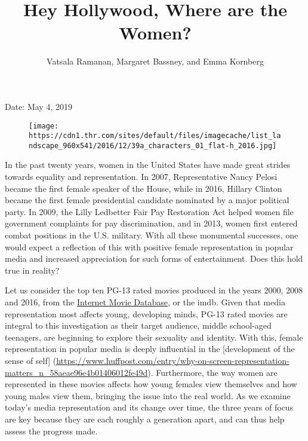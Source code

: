 \documentclass[ignorenonframetext,]{beamer}
\title{Hey Hollywood, Where are the Women?}
\author{Vatsala Ramanan, Margaret Bassney, and Emma Kornberg}
\date{}
\begin{document}
\frame{\titlepage}

\begin{frame}

Date: May 4, 2019

\begin{figure}
\centering
\texttt{[image: https://cdn1.thr.com/sites/default/files/imagecache/list\_landscape\_960x541/2016/12/39a\_characters\_01\_flat-h\_2016.jpg]}
\caption{}
\end{figure}

In the past twenty years, women in the United States have made great
strides towards equality and representation. In 2007, Representative
Nancy Pelosi became the first female speaker of the House, while in
2016, Hillary Clinton became the first female presidential candidate
nominated by a major political party. In 2009, the Lilly Ledbetter Fair
Pay Restoration Act helped women file government complaints for pay
discrimination, and in 2013, women first entered combat positions in the
U.S. military. With all these monumental successes, one would expect a
reflection of this with positive female representation in popular media
and increased appreciation for such forms of entertainment. Does this
hold true in reality?

Let us consider the top ten PG-13 rated movies produced in the years
2000, 2008 and 2016, from the
\href{https://www.imdb.com/pressroom/about/}{Internet Movie Database},
or the imdb. Given that media representation most affects young,
developing minds, PG-13 rated movies are integral to this investigation
as their target audience, middle school-aged teenagers, are beginning to
explore their sexuality and identity. With this, female representation
in popular media is deeply influential in the {[}development of the
sense of self{]}
(\url{https://www.huffpost.com/entry/why-on-screen-representation-matters_n_58aeae96e4b01406012fe49d}).
Furthermore, the way women are represented in these movies affects how
young females view themselves and how young males view them, bringing
the issue into the real world. As we examine today's media
representation and its change over time, the three years of focus are
key because they are each roughly a generation apart, and can thus help
assess the progress made.

\end{frame}
\end{document}
